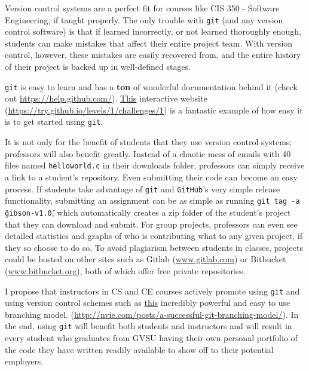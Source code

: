 \documentclass[12pt]{article}
\numberwithin{figure}{section}
\numberwithin{equation}{section}
\begin{document}
{\bigskip

Version control systems are a perfect fit for courses like CIS 350 -
Software Engineering, if taught properly. The only trouble with
\texttt{git} (and any version control software) is that if learned
incorrectly, or not learned thoroughly enough, students can make
mistakes that affect their entire project team. With version control,
however, these mistakes are easily recovered from, and the entire
history of their project is backed up in well-defined stages.

\bigskip

\texttt{git} is easy to learn and has a \textbf{ton} of wonderful
documentation behind it (check out \url{https://help.github.com/}).
\href{https://try.github.io/levels/1/challenges/1}{This} interactive
website (\url{https://try.github.io/levels/1/challenges/1}) is a
fantastic example of how easy it is to get started using \texttt{git}.

\bigskip

It is not only for the benefit of students that they use version control
systems; professors will also benefit greatly. Instead of a chaotic mess
of emails with 40 files named \texttt{helloworld.c} in their downloads
folder, professors can simply receive a link to a student's repository.
Even submitting their code can become an easy process. If students take
advantage of \texttt{git} and \texttt{GitHub}'s very simple release
functionality, submitting an assignment can be as simple as running
\texttt{git tag -a \"gibson-v1.0\"}, which automatically creates a zip
folder of the student's project that they can download and submit. For
group projects, professors can even see detailed statistics and graphs
of who is contributing what to any given project, if they so choose to
do so. To avoid plagiarism between students in classes, projects could
be hosted on other sites such as Gitlab (\href{https://www.gitlab.com}{www.gitlab.com}) or Bitbucket
(\href{https://www.bitbucket.org}{www.bitbucket.org}), both of which offer free private repositories.

\bigskip

I propose that instructors in CS and CE courses actively promote using
\texttt{git} and using version control schemes such as
\href{http://nvie.com/posts/a-successful-git-branching-model/}{this}
incredibly powerful and easy to use branching model.
(\url{http://nvie.com/posts/a-successful-git-branching-model/}). In the
end, using \texttt{git} will benefit both students and instructors and
will result in every student who graduates from GVSU having their own
personal portfolio of the code they have written readily available to
show off to their potential employers.

}
\end{document}
